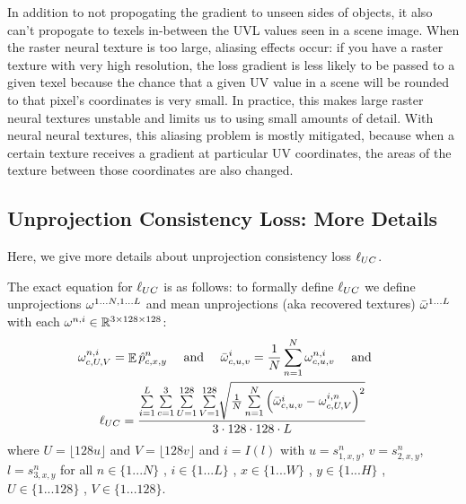 	In addition to not propogating the gradient to unseen sides of objects, it also can't propogate to texels in-between the UVL values seen in a scene image.
	When the raster neural texture is too large, aliasing effects occur: if you have a raster texture with very high resolution, the loss gradient is less likely to be passed to a given texel because the chance that a given UV value in a scene will be rounded to that pixel's coordinates is very small.
	In practice, this makes large raster neural textures unstable and limits us to using small amounts of detail.
	With neural neural textures, this aliasing problem is mostly mitigated, because when a certain texture receives a gradient at particular UV coordinates, the areas of the texture between those coordinates are also changed.

\subsection{Unprojection Consistency Loss: More Details}

	Here, we give more details about unprojection consistency loss $\ell_{UC}$.

	The exact equation for $\ell_{UC}$ is as follows:
	to formally define $\ell_{UC}$ we define unprojections $\omega^{1...N,1...L}$ and mean unprojections (aka recovered textures) $\bar{\omega}^{1...L}$ 
	with each $\omega^{n,i}\in\mathbb{R}^{3\times128\times128}$:
	\begin{multline}
		\omega_{c,U,V}^{n,i}=\mathop{\mathbb{E}}\hat{p}_{c,x,y}^n 
		\ \ \ \text{ and }\ \ \  \bar{\omega}^i_{c,u,v}   =   
			\frac{1}{N} \sum\limits_{n=1}^N\omega^{n,i}_{c,u,v} 
		\ \ \ \text{ and }\ \ \  \\
		\ell_{UC}=\frac{\sum\limits_{i=1}^L\sum\limits_{c=1}^3\sum\limits_{U=1}^{128}\sum\limits_{V=1}^{128}
		\sqrt[]{\frac{1}{N}\sum\limits_{n=1}^N\left(\bar{\omega}^i_{c,u,v}-\omega^{i,n}_{c,U,V}\right)^2}}
		{3\cdot128\cdot128\cdot L}
	\end{multline}
	where $U=\lfloor128u\rfloor$ and $V=\lfloor128v\rfloor$ and $i=I(l)$ with
	$u=s^n_{1,x,y}$, $v=s^n_{2,x,y}$, $l=s^n_{3,x,y}$
	for all 
	$n \in \{1...N\}$ , 
	$i \in \{1...L\}$ , 
	$x \in \{1...W\}$ , 
	$y \in \{1...H\}$ , 
	$U \in \{1...128\}$ , 
	$V \in \{1...128\}$.


